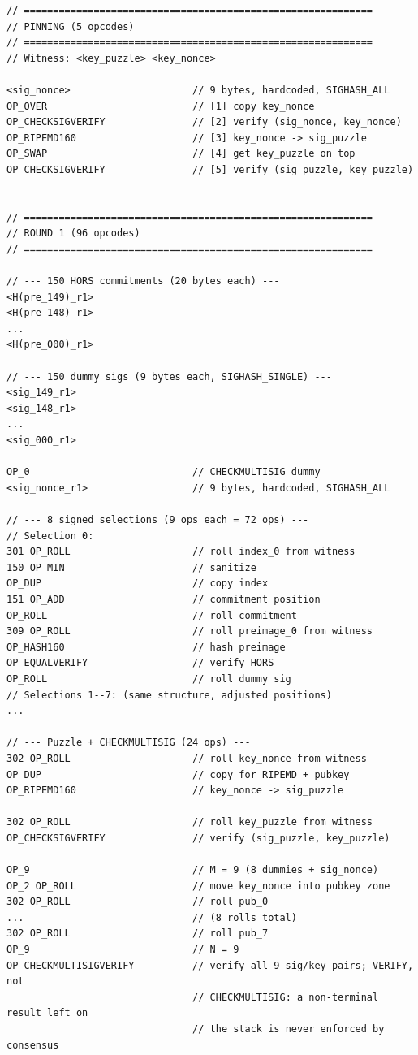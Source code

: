 \documentclass[11pt, a4paper]{article}
\begin{document}
\begin{lstlisting}[language={}, numbers=none, basicstyle=\scriptsize\ttfamily]
// ============================================================
// PINNING (5 opcodes)
// ============================================================
// Witness: <key_puzzle> <key_nonce>

<sig_nonce>                     // 9 bytes, hardcoded, SIGHASH_ALL
OP_OVER                         // [1] copy key_nonce
OP_CHECKSIGVERIFY               // [2] verify (sig_nonce, key_nonce)
OP_RIPEMD160                    // [3] key_nonce -> sig_puzzle
OP_SWAP                         // [4] get key_puzzle on top
OP_CHECKSIGVERIFY               // [5] verify (sig_puzzle, key_puzzle)


// ============================================================
// ROUND 1 (96 opcodes)
// ============================================================

// --- 150 HORS commitments (20 bytes each) ---
<H(pre_149)_r1>
<H(pre_148)_r1>
...
<H(pre_000)_r1>

// --- 150 dummy sigs (9 bytes each, SIGHASH_SINGLE) ---
<sig_149_r1>
<sig_148_r1>
...
<sig_000_r1>

OP_0                            // CHECKMULTISIG dummy
<sig_nonce_r1>                  // 9 bytes, hardcoded, SIGHASH_ALL

// --- 8 signed selections (9 ops each = 72 ops) ---
// Selection 0:
301 OP_ROLL                     // roll index_0 from witness
150 OP_MIN                      // sanitize
OP_DUP                          // copy index
151 OP_ADD                      // commitment position
OP_ROLL                         // roll commitment
309 OP_ROLL                     // roll preimage_0 from witness
OP_HASH160                      // hash preimage
OP_EQUALVERIFY                  // verify HORS
OP_ROLL                         // roll dummy sig
// Selections 1--7: (same structure, adjusted positions)
...

// --- Puzzle + CHECKMULTISIG (24 ops) ---
302 OP_ROLL                     // roll key_nonce from witness
OP_DUP                          // copy for RIPEMD + pubkey
OP_RIPEMD160                    // key_nonce -> sig_puzzle

302 OP_ROLL                     // roll key_puzzle from witness
OP_CHECKSIGVERIFY               // verify (sig_puzzle, key_puzzle)

OP_9                            // M = 9 (8 dummies + sig_nonce)
OP_2 OP_ROLL                    // move key_nonce into pubkey zone
302 OP_ROLL                     // roll pub_0
...                             // (8 rolls total)
302 OP_ROLL                     // roll pub_7
OP_9                            // N = 9
OP_CHECKMULTISIGVERIFY          // verify all 9 sig/key pairs; VERIFY, not
                                // CHECKMULTISIG: a non-terminal result left on
                                // the stack is never enforced by consensus



\end{lstlisting}
\end{document}
